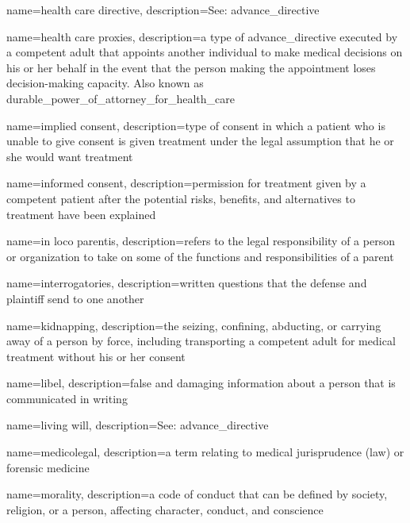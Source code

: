 \documentclass[../../EMT-169.tex]{subfiles}
\begin{document}
	{
		name=health care directive,
		description={See: \gls{advance_directive}}
	}

	{
		name=health care proxies,
		description={a type of \gls{advance_directive} executed by a competent adult that appoints another individual to make medical decisions on his or her behalf in the event that the person making the appointment loses decision-making capacity.  Also known as \gls{durable_power_of_attorney_for_health_care}}
	}
	
	{
		name=implied consent,
		description={type of consent in which a patient who is unable to give consent is given treatment under the legal assumption that he or she would want treatment}
	}

	{
		name=informed consent,
		description={permission for treatment given by a competent patient after the potential risks, benefits, and alternatives to treatment have been explained}
	}
	
	{
		name=in loco parentis,
		description={refers to the legal responsibility of a person or organization to take on some of the functions and responsibilities of a parent}
	}

	{
		name=interrogatories,
		description={written questions that the defense and plaintiff send to one another}
	}
	
	{
		name=kidnapping,
		description={the seizing, confining, abducting, or carrying away of a person by force, including transporting a competent adult for medical treatment without his or her consent}
	}

	{
		name=libel,
		description={false and damaging information about a person that is communicated in writing}
	}


	{
		name=living will,
		description={See: \gls{advance_directive}}
	}

	{
		name=medicolegal,
		description={a term relating to medical jurisprudence (law) or forensic medicine}
	}

	{
		name=morality,
		description={a code of conduct that can be defined by society, religion, or a person, affecting character, conduct, and conscience}
	}
\end{document}
